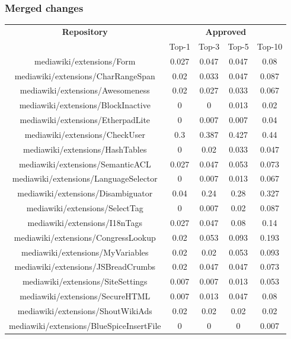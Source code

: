 \subsubsection{Merged changes}
\begin{center}
\hspace{0.25cm}
\begin{tabular}{@{}c c c c c@{}} 
 \hline
    \textbf{Repository} &
    \multicolumn{4}{c}{\textbf{Approved}} \\
      & {Top-1} & {Top-3} & {Top-5} & {Top-10} \\
      \hline
mediawiki/extensions/Form & 0.027 & 0.047 & 0.047 & 0.08 \\
mediawiki/extensions/CharRangeSpan & 0.02 & 0.033 & 0.047 & 0.087 \\
mediawiki/extensions/Awesomeness & 0.02 & 0.027 & 0.033 & 0.067 \\
mediawiki/extensions/BlockInactive & 0 & 0 & 0.013 & 0.02 \\
mediawiki/extensions/EtherpadLite & 0 & 0.007 & 0.007 & 0.04 \\
mediawiki/extensions/CheckUser & 0.3 & 0.387 & 0.427 & 0.44 \\
mediawiki/extensions/HashTables & 0 & 0.02 & 0.033 & 0.047 \\
mediawiki/extensions/SemanticACL & 0.027 & 0.047 & 0.053 & 0.073 \\
mediawiki/extensions/LanguageSelector & 0 & 0.007 & 0.013 & 0.067 \\
mediawiki/extensions/Disambiguator & 0.04 & 0.24 & 0.28 & 0.327 \\
mediawiki/extensions/SelectTag & 0 & 0.007 & 0.02 & 0.087 \\
mediawiki/extensions/I18nTags & 0.027 & 0.047 & 0.08 & 0.14 \\
mediawiki/extensions/CongressLookup & 0.02 & 0.053 & 0.093 & 0.193 \\
mediawiki/extensions/MyVariables & 0.02 & 0.02 & 0.053 & 0.093 \\
mediawiki/extensions/JSBreadCrumbs & 0.02 & 0.047 & 0.047 & 0.073 \\
mediawiki/extensions/SiteSettings & 0.007 & 0.007 & 0.013 & 0.053 \\
mediawiki/extensions/SecureHTML & 0.007 & 0.013 & 0.047 & 0.08 \\
mediawiki/extensions/ShoutWikiAds & 0.02 & 0.02 & 0.02 & 0.02 \\
mediawiki/extensions/BlueSpiceInsertFile & 0 & 0 & 0 & 0.007 \\

\end{tabular}
\end{center}
